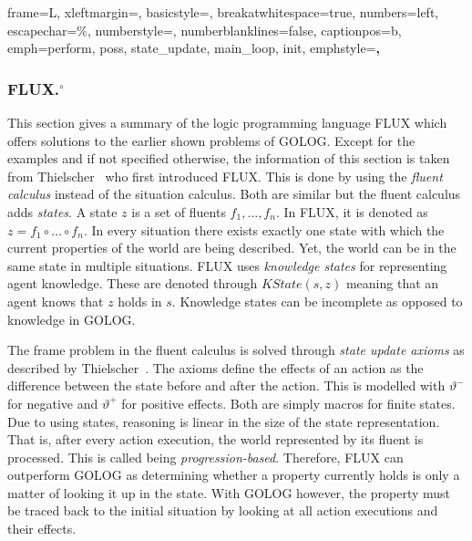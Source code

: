  { %
  frame=L,
  xleftmargin=\parindent,
  basicstyle=\footnotesize\ttfamily,
  breakatwhitespace=true,
  numbers=left,
  escapechar=\%,
  numberstyle=\tiny,
  numberblanklines=false,
  captionpos=b,
  emph={perform, poss, state\_update, main\_loop, init},
  emphstyle=\textbf,
}
%
\lstset{style=flux} %
\subsubsection[FLUX.]{FLUX.$^\circ$}\label{fun:apl_flux}
This section gives a summary of the logic programming language FLUX which offers solutions to the earlier shown problems of GOLOG.
Except for the examples and if not specified otherwise, the information of this section is taken from Thielscher~\cite{thielscher_flux:_2005} who first introduced FLUX.
This is done by using the \emph{fluent calculus} instead of the situation calculus.
Both are similar but the fluent calculus adds \emph{states}.
A state $z$ is a set of fluents $f_1,\dotsc,f_n$.
In FLUX, it is denoted as $z = f_1 \circ\dotsc\circ f_n$.
In every situation there exists exactly one state with which the current properties of the world are being described.
Yet, the world can be in the same state in multiple situations.
FLUX uses \emph{knowledge states} for representing agent knowledge.
These are denoted through $\textit{KState}(s,z)$ meaning that an agent knows that $z$ holds in $s$.
Knowledge states can be incomplete as opposed to knowledge in GOLOG.

The frame problem in the fluent calculus is solved through \emph{state update axioms} as described by Thielscher~\cite{thielscher_situation_1999}.
The axioms define the effects of an action as the difference between the state before and after the action.
This is modelled with $\vartheta^-$ for negative and $\vartheta^+$ for positive effects.
Both are simply macros for finite states.
Due to using states, reasoning is linear in the size of the state representation.
That is, after every action execution, the world represented by its fluent is processed.
This is called being \emph{progression-based}.
Therefore, FLUX can outperform GOLOG as determining whether a property currently holds is only a matter of looking it up in the state.
With GOLOG however, the property must be traced back to the initial situation by looking at all action executions and their effects. %

